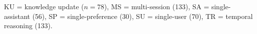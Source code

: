 \begin{table}[t]
\begin{minipage}[t]{0.475\textwidth}
\vspace{2pt}
\raggedright KU = knowledge update ($n=78$), MS = multi-session (133), SA = single-assistant (56), SP = single-preference (30), SU = single-user (70), TR = temporal reasoning (133).\par
\end{minipage}
\end{table}
